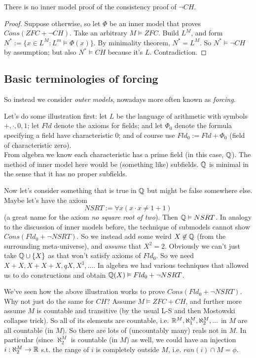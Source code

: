 \documentclass[a4paper]{article}
\begin{document}
\begin{coro}
There is no inner model proof of the consistency proof of $\neg CH$.
\begin{proof}
Suppose otherwise, so let $\Phi$ be an inner model that proves $Cons(ZFC+\neg CH)$. Take an arbitrary $M \vDash ZFC$. Build $L^M$, and form $N^*:=\{x \in L^M: L^m \vDash \Phi(x)\}$. By minimality theorem, $N^* = L^M$. So $N^* \vDash \neg CH$ by assumption; but also $N^* \vDash CH$ because it's $L$. Contradiction.
\end{proof}
\end{coro}

\subsection{Basic terminologies of forcing}

So instead we consider \emph{outer models}, nowadays more often known as \emph{forcing}.

Let's do some illustration first: let $L$ be the language of arithmetic with symbols $+,\cdot,0,1$; let $Fld$ denote the axioms for fields; and let $\Phi_0$ denote the formula specifying a field have characteristic 0; and of course use $Fld_0 := Fld+\Phi_0$ (field of characteristic zero).\\
From algebra we know each characteristic has a prime field (in this case, $\mathbb{Q}$). The method of inner model here would be (something like) subfields. $\mathbb{Q}$ is minimal in the sense that it has no proper subfields.

Now let's consider something that is true in $\mathbb{Q}$ but might be false somewhere else. Maybe let's have the axiom
\[
NSRT := \forall x (x \cdot x \neq 1+1)
\]
(a great name for the axiom \emph{no square root of two}). Then $\mathbb{Q} \vDash NSRT$. In analogy to the discussion of inner models before, the technique of submodels cannot show $Cons(Fld_0+\neg NSRT)$. So we instead add some weird $X \not\in \mathbb{Q}$ (from the surrounding meta-universe), and \emph{assume} that $X^2=2$. Obviously we can't just take $\mathbb{Q} \cup \{X\}$ as that won't satisfy axioms of $Fld_0$. So we need $X+X,X+X+X,qX,X^3,...$. In algebra we had various techniques that allowed us to do constructions and obtain $\mathbb{Q}(X) \vDash Fld_0+\neg NSRT$.

We've seen how the above illustration works to prove $Cons(Fld_0+\neg NSRT)$. Why not just do the same for $CH$? Assume $M \vDash ZFC+CH$, and further more assume $M$ is countable and transitive (by the usual L-S and then Mostowski collapse trick). So all of its elements are countable, i.e. $\mathbb{R}^M,\aleph_1^M,\aleph_2^M,...$ in $M$ are all countable (in $M$). So there are lots of (uncountably many) reals not in $M$. In particular (since $\aleph_2^M$ is countable (in $M$) as well, we could have an injection $i: \aleph_2^M \to \mathbb{R}$ s.t. the range of $i$ is completely outside $M$, i.e. $ran(i) \cap M = \phi$.
\end{document}
